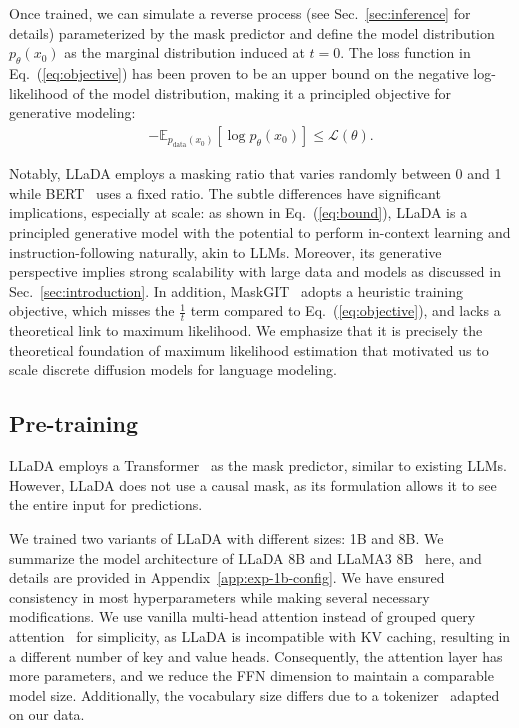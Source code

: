 \documentclass{article}
\begin{document}
Once trained, we can simulate a reverse process (see Sec.~\ref{sec:inference} for details) parameterized by the mask predictor and define the model distribution \( p_\theta(x_0) \) as the marginal distribution induced at \( t = 0 \). The loss function in Eq.~(\ref{eq:objective}) has been proven to be an upper bound on the negative log-likelihood of the model distribution, making it a principled objective for generative modeling:
\begin{align}
\label{eq:bound}
    - \mathbb{E}_{p_{\textrm{data}}(x_0)} \left[\log p_\theta(x_0) \right]  \le  \mathcal{L}(\theta).
\end{align} 

Notably, LLaDA employs a masking ratio that varies randomly between 0 and 1 while BERT~\citep{devlin2018bert} uses a fixed ratio. The subtle differences have significant implications, especially at scale: as shown in Eq.~(\ref{eq:bound}), LLaDA is a principled generative model with the potential to perform in-context learning and instruction-following naturally, akin to LLMs. Moreover, its generative perspective implies strong scalability with large data and models as discussed in Sec.~\ref{sec:introduction}. In addition, MaskGIT~\citep{chang2022maskgit} adopts a heuristic training objective, which misses the $\frac{1}{t}$ term compared to Eq.~(\ref{eq:objective}), and lacks a theoretical link to maximum likelihood. We emphasize that it is precisely the theoretical foundation of maximum likelihood estimation that motivated us to scale discrete diffusion models for language modeling.



\subsection{Pre-training}
\label{sec:pre-traing}

LLaDA employs a Transformer~\citep{vaswani2017attention} as the mask predictor, similar to existing LLMs. However, LLaDA does not use a causal mask, as its formulation allows it to see the entire input for predictions.

We trained two variants of LLaDA with different sizes: 1B and 8B.
We summarize the model architecture of LLaDA 8B and LLaMA3 8B~\citep{dubey2024llama} here, and details are provided in Appendix~\ref{app:exp-1b-config}. We have ensured consistency in most hyperparameters while making several necessary modifications. We use vanilla multi-head attention instead of grouped query attention~\citep{ainslie2023gqa} for simplicity, as LLaDA is incompatible with KV caching, resulting in a different number of key and value heads. Consequently, the attention layer has more parameters, and we reduce the FFN dimension to maintain a comparable model size. Additionally, the vocabulary size differs due to a tokenizer~\citep{brown2020language} adapted on our data.
\end{document}
